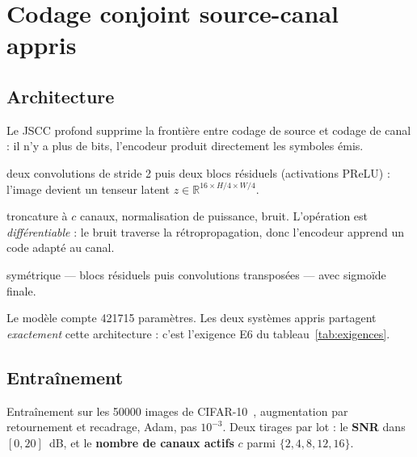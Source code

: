 \chapter{Codage conjoint source-canal appris}
\label{chap:jscc}

\section{Architecture}
\label{sec:archi_jscc}

Le JSCC profond supprime la frontière entre codage de source et codage de canal : il n'y a plus de bits,
l'encodeur produit directement les symboles émis.

\begin{description}[leftmargin=2.2cm, style=nextline]
  \item[Encodeur] deux convolutions de stride 2 puis deux blocs résiduels (activations PReLU) : l'image
        devient un tenseur latent $z \in \mathbb{R}^{16\times H/4\times W/4}$.
  \item[Couche de canal] troncature à $c$ canaux, normalisation de puissance, bruit. L'opération est
        \emph{différentiable} : le bruit traverse la rétropropagation, donc l'encodeur apprend un code adapté
        au canal.
  \item[Décodeur] symétrique — blocs résiduels puis convolutions transposées — avec sigmoïde finale.
\end{description}

Le modèle compte \num{421715} paramètres. Les deux systèmes appris partagent \emph{exactement} cette
architecture : c'est l'exigence E6 du tableau~\ref{tab:exigences}.

\section{Entraînement}
\label{sec:entrainement}

Entraînement sur les \num{50000} images de CIFAR-10~\cite{krizhevsky2009}, augmentation par retournement et
recadrage, Adam, pas $10^{-3}$. Deux tirages par lot : le \textbf{SNR} dans $[0,20]$~dB, et le \textbf{nombre
de canaux actifs} $c$ parmi $\{2,4,8,12,16\}$.


